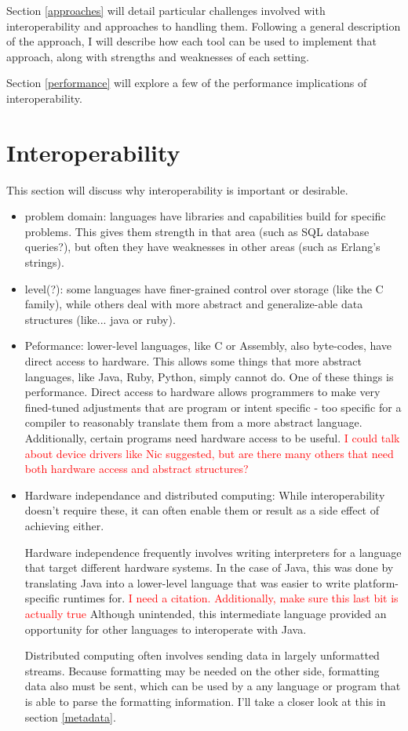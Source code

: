 \documentclass{sig-alternate}
\newcommand{\mycomment}[1]{\textcolor{red}{#1}}
\begin{document}
Section \ref{approaches} will detail particular challenges involved with interoperability and approaches to handling them. Following a general description of the approach, I will describe how each tool can be used to implement that approach, along with strengths and weaknesses of each setting.

Section \ref{performance} will explore a few of the performance implications of interoperability.


\section{Interoperability}\label{Interop}
This section will discuss why interoperability is important or desirable.
\begin{itemize}
	\item problem domain: languages have libraries and capabilities build for specific problems. This gives them strength in that area (such as SQL database queries?), but often they have weaknesses in other areas (such as Erlang's strings).
	\item level(?): some languages have finer-grained control over storage (like the C family), while others deal with more abstract and generalize-able data structures (like... java or ruby).
	
	\item Peformance: lower-level languages, like C or Assembly, also byte-codes, have direct access to hardware. This allows some things that more abstract languages, like Java, Ruby, Python, simply cannot do. One of these things is performance. Direct access to hardware allows programmers to make very fined-tuned adjustments that are program or intent specific - too specific for a compiler to reasonably translate them from a more abstract language.
	Additionally, certain programs need hardware access to be useful. \mycomment{I could talk about device drivers like Nic suggested, but are there many others that need both hardware access and abstract structures?}
		
	\item Hardware independance and distributed computing: While interoperability doesn't require these, it can often enable them or result as a side effect of achieving either.
	
	Hardware independence frequently involves writing interpreters for a language that target different hardware systems. In the case of Java, this was done by translating Java into a lower-level language that was easier to write platform-specific runtimes for.
	\mycomment{I need a citation. Additionally, make sure this last bit is actually true}
	Although unintended, this intermediate language provided an opportunity for other languages to interoperate with Java.	
	
	Distributed computing often involves sending data in largely unformatted streams. Because formatting may be needed on the other side, formatting data also must be sent, which can be used by a any language or program that is able to parse the formatting information. I'll take a closer look at this in section \ref{metadata}.
\end{itemize}
\end{document}

